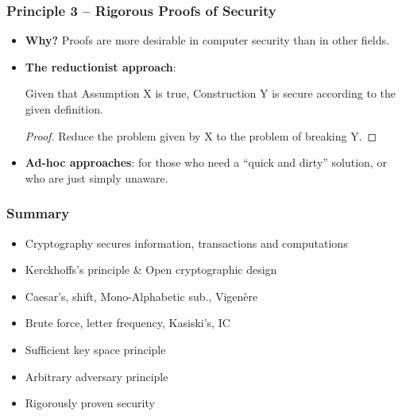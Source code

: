 \begin{frame}\frametitle{Principle 3 -- Rigorous Proofs of Security}
\begin{itemize}
\item \textbf{Why?} Proofs are more desirable in computer security than in other fields.
\item \textbf{The reductionist approach}: 
\begin{theorem}	Given that Assumption X is true, Construction Y is secure according to the given definition.
\end{theorem}
\begin{proof} Reduce the problem given by X to the problem of breaking Y.
\end{proof}
\item \textbf{Ad-hoc approaches}: for those who need a ``quick and dirty'' solution, or who are just simply unaware.
\end{itemize}
\end{frame}
\begin{frame}\frametitle{Summary}
\begin{itemize}
\item Cryptography secures information, transactions and computations
\item Kerckhoffs's principle \& Open cryptographic design
\item Caesar's, shift, Mono-Alphabetic sub., Vigen\`{e}re
\item Brute force, letter frequency, Kasiski's, IC
\item Sufficient key space principle
\item Arbitrary adversary principle
\item Rigorously proven security
\end{itemize}
\end{frame}



